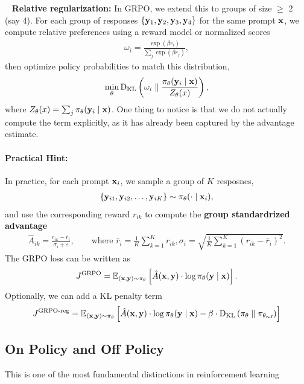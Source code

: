 \documentclass[11pt]{article}  %
\begin{document}
\textbullet~ \textbf{Relative regularization:} In GRPO, we extend this to groups of size $\geq$ 2 (say 4).
For each group of responses $\left\{ \mathbf{y}_1, \mathbf{y}_2, \mathbf{y}_3, \mathbf{y}_4 \right\}$ for the same prompt $\mathbf{x}$, we compute relative preferences using a reward model or normalized scores 
\begin{align*}
  \omega_i = \frac{\exp(\beta r_i)}{\sum_{j} \exp(\beta r_j)},
\end{align*}
then optimize policy probabilities to match this distribution, 
\begin{align*}
  \min_\theta {\rm D}_{\text{KL}}\left( \omega_i \parallel \frac{\pi_{\theta}(\mathbf{y}_i \mid \mathbf{x})}{Z_{\theta}(x)} \right),
\end{align*}
where $Z_{\theta}(x) = \sum_{j} \pi_\theta(\mathbf{y}_i \mid \mathbf{x})$.
One thing to notice is that we do not actually compute the term explicitly, as it has already been captured by the advantage estimate.

\paragraph{Practical Hint:}
In practice, for each prompt $\mathbf{x}_i$, we sample a group of $K$ resposnes, 
\begin{align*}
  \left\{ \mathbf{y}_{i1}, \mathbf{y}_{i2}, \hdots, \mathbf{y}_{iK} \right\} \sim \pi_{\theta}(\cdot \mid \mathbf{x}_i),
\end{align*}
and use the corresponding reward $r_{ik}$ to compute the \textbf{group standardrized advantage}
\begin{align*}
  \hat{A}_{ik} = \frac{r_{ik} - \bar{r}_i}{\sigma_i + \varepsilon}, \qquad \text{where } \bar{r}_i = \frac{1}{K}\sum_{k=1}^{K}r_{ik}, \sigma_i = \sqrt{\frac{1}{K}\sum_{k=1}^{K} (r_{ik} - \bar{r}_i)^2}.
\end{align*} 
The GRPO loss can be written as 
\begin{align*}
  J^{\text{GRPO}} = \mathbb{E}_{(\mathbf{x}, \mathbf{y}) \sim \pi_{\theta}}\left[\hat{A}(\mathbf{x}, \mathbf{y})\cdot\log \pi_{\theta}(\mathbf{y} \mid \mathbf{x})\right].
\end{align*}
Optionally, we can add a KL penalty term 
\begin{align*}
  J^{\text{GRPO-reg}} = \mathbb{E}_{(\mathbf{x}, \mathbf{y}) \sim \pi_{\theta}}\left[\hat{A}(\mathbf{x}, \mathbf{y})\cdot\log \pi_{\theta}(\mathbf{y} \mid \mathbf{x}) - \beta\cdot {\rm D}_{\text{KL}}\left( \pi_{\theta} \parallel \pi_{\theta_{\text{ref}}} \right)\right]
\end{align*}


\subsection{On Policy and Off Policy}
This is one of the most fundamental distinctions in reinforcement learning
\end{document}
